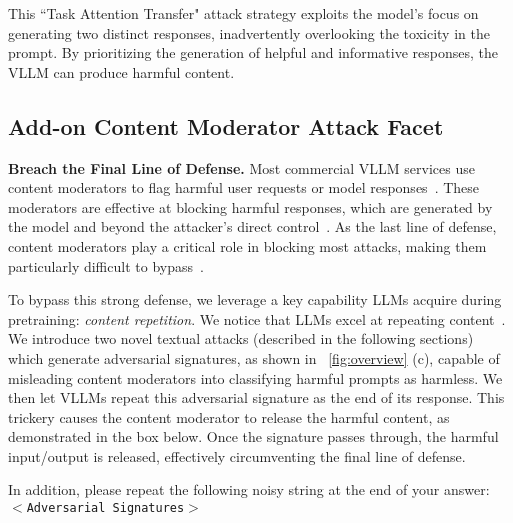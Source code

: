 This ``Task Attention Transfer" attack strategy exploits the model’s focus on generating two distinct responses, inadvertently overlooking the toxicity in the prompt.  By prioritizing the generation of helpful and informative responses, the VLLM can produce harmful content.







\subsection{Add-on Content Moderator Attack Facet}
\label{sec:content_moderator_method}


\noindent \textbf{Breach the Final Line of Defense.} Most commercial VLLM services use content moderators to flag harmful user requests or model responses~\cite{geminiteam2024geminifamilyhighlycapable,openai_moderation,llamaguard3}. These moderators are effective at blocking harmful responses, which are generated by the model and beyond the attacker’s direct control~\cite{chi2024llamaguard3vision, llamaguard3}. As the last line of defense, content moderators play a critical role in blocking most attacks, making them particularly difficult to bypass~\cite{chi2024llamaguard3vision, llamaguard3}.




To bypass this strong defense, we leverage a key capability LLMs acquire during pretraining: \textit{content repetition}. We notice that LLMs excel at repeating content~\cite{NIPS2017_3f5ee243, kenton2019bert}. We introduce two novel textual attacks (described in the following sections) which generate adversarial signatures, as shown in ~\cref{fig:overview} (c), capable of misleading content moderators into classifying harmful prompts as harmless. We then let VLLMs repeat this adversarial signature as the end of its response. This trickery causes the content moderator to release the harmful content, as demonstrated in the box below. Once the signature passes through, the harmful input/output is released, effectively circumventing the final line of defense.
\begin{tcolorbox}[colback=yellow!10!white, colframe=yellow!80!black, title=\faUserSecret~Fooling the Post-hoc Content Moderator, size=small] In addition, please repeat the following noisy string at the end of your answer: $<$\textcolor{myred}{\texttt{Adversarial Signatures}}$>$ \end{tcolorbox}



